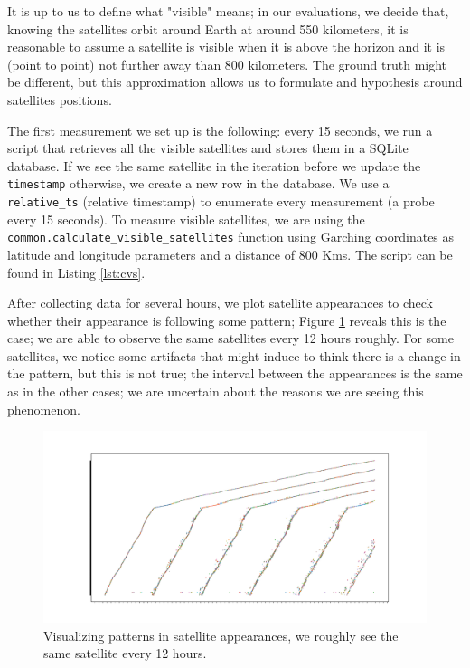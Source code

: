 \documentclass[IN,11pt,twoside,openright,idp,english]{tumthesis}
\begin{document}
It is up to us to define what "visible" means; in our evaluations, we decide that, knowing the satellites orbit around
Earth at around 550 kilometers, it is reasonable to assume a satellite is visible when it is above the horizon and it is
(point to point) not further away than 800 kilometers. The ground truth might be different, but this approximation
allows us to formulate and hypothesis around satellites positions. 

The first measurement we set up is the following: every 15 seconds, we run a script that retrieves all the visible
satellites and stores them in a SQLite database. If we see the same satellite in the iteration before we update the
\texttt{timestamp} otherwise, we create a new row in the database. We use a \texttt{relative\_ts} (relative timestamp)
to enumerate every measurement (a probe every 15 seconds). To measure visible satellites, we are using the
\texttt{common.calculate\_visible\_satellites} function using Garching coordinates as latitude and longitude parameters
and a distance of 800 Kms. The script can be found in Listing \ref{lst:cvs}.

After collecting data for several hours, we plot satellite appearances to check whether their appearance is following
some pattern; Figure \ref{fig:vis-sat-pat} reveals this is the case; we are able to observe the same satellites every 12
hours roughly. For some satellites, we notice some artifacts that might induce to think there is a change in the
pattern, but this is not true; the interval between the appearances is the same as in the other cases; we are uncertain
about the reasons we are seeing this phenomenon.

\begin{figure}
    \centering
    \includegraphics[width=1.0\columnwidth]{img/patterns-in-satellite-appearances.pdf}
    \caption{Visualizing patterns in satellite appearances, we roughly see the same satellite every 12 hours.}
    \label{fig:vis-sat-pat}
\end{figure}
\end{document}
